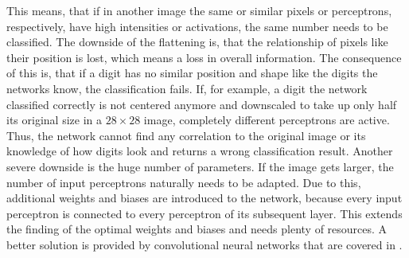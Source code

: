 This means, that if in another image the same or similar pixels or perceptrons, respectively, have high intensities or activations, the same number needs to be classified.
The downside of the flattening is, that the relationship of pixels like their position is lost, which means a loss in overall information.
The consequence of this is, that if a digit has no similar position and shape like the digits the networks know, the classification fails.
If, for example, a digit the network classified correctly is not centered anymore and downscaled to take up only half its original size in a $28 \times 28$ image, completely different perceptrons are active.
Thus, the network cannot find any correlation to the original image or its knowledge of how digits look and returns a wrong classification result.
Another severe downside is the huge number of parameters.
If the image gets larger, the number of input perceptrons naturally needs to be adapted.
Due to this, additional weights and biases are introduced to the network, because every input perceptron is connected to every perceptron of its subsequent layer.
This extends the finding of the optimal weights and biases and needs plenty of resources.
A better solution is provided by convolutional neural networks that are covered in .
